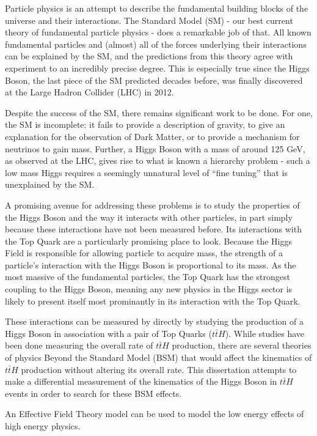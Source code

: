 Particle physics is an attempt to describe the fundamental building blocks of the universe and their interactions. The Standard Model (SM) - our best current theory of fundamental particle physics - does a remarkable job of that. All known fundamental particles and (almost) all of the forces underlying their interactions can be explained by the SM, and the predictions from this theory agree with experiment to an incredibly precise degree. This is especially true since the Higgs Boson, the last piece of the SM predicted decades before, was finally discovered at the Large Hadron Collider (LHC) in 2012. 

Despite the success of the SM, there remains significant work to be done. For one, the SM is incomplete: it fails to provide a description of gravity, to give an explanation for the observation of Dark Matter, or to provide a mechanism for neutrinos to gain mass. Further, a Higgs Boson with a mass of around 125 GeV, as observed at the LHC, gives rise to what is known a hierarchy problem - such a low mass Higgs requires a seemingly unnatural level of ``fine tuning'' that is unexplained by the SM.

A promising avenue for addressing these problems is to study the properties of the Higgs Boson and the way it interacts with other particles, in part simply because these interactions have not been measured before. Its interactions with the Top Quark are a particularly promising place to look. Because the Higgs Field is responsible for allowing particle to acquire mass, the strength of a particle's interaction with the Higgs Boson is proportional to its mass. As the most massive of the fundamental particles, the Top Quark has the strongest coupling to the Higgs Boson, meaning any new physics in the Higgs sector is likely to present itself most prominantly in its interaction with the Top Quark.

These interactions can be measured by directly by studying the production of a Higgs Boson in association with a pair of Top Quarks ($t\bar{t}H$). While studies have been done measuring the overall rate of $t\bar{t}H$ production, there are several theories of physics Beyond the Standard Model (BSM) that would affect the kinematics of $t\bar{t}H$ production without altering its overall rate. This dissertation attempts to make a differential measurement of the kinematics of the Higgs Boson in $t\bar{t}H$ events in order to search for these BSM effects.

An Effective Field Theory model can be used to model the low energy effects of high energy physics.

